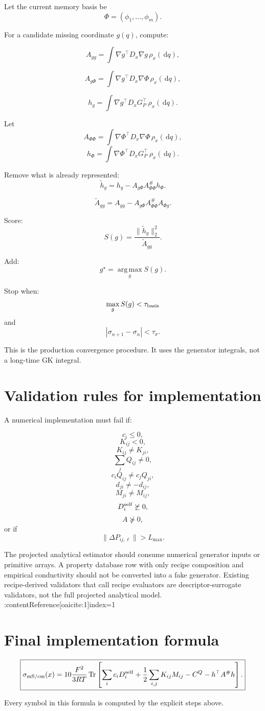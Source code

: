 \documentclass[11pt]{article}
\newcommand{\dd}{\,\mathrm d}
\newcommand{\Tr}{\operatorname{Tr}}
\newcommand{\argmax}{\operatorname*{arg\,max}}
\begin{document}
  Let the current memory basis be
  \[
  \Phi=(\phi_1,\ldots,\phi_m).
  \]

  For a candidate missing coordinate \(g(q)\), compute:

  \[
  A_{gg}
  =
  \int
  \nabla g^\top D_x\nabla g\,\rho_x(\dd q),
  \]

  \[
  A_{g\Phi}
  =
  \int
  \nabla g^\top D_x\nabla\Phi\,\rho_x(\dd q),
  \]

  \[
  h_g
  =
  \int
  \nabla g^\top D_xG_P^\top\,\rho_x(\dd q).
  \]

  Let
  \[
  A_{\Phi\Phi}
  =
  \int
  \nabla\Phi^\top D_x\nabla\Phi\,\rho_x(\dd q),
  \]
  \[
  h_\Phi
  =
  \int
  \nabla\Phi^\top D_xG_P^\top\,\rho_x(\dd q).
  \]

  Remove what is already represented:
  \[
  \tilde h_g
  =
  h_g-A_{g\Phi}A_{\Phi\Phi}^\#h_\Phi.
  \]

  \[
  \tilde A_{gg}
  =
  A_{gg}-A_{g\Phi}A_{\Phi\Phi}^\#A_{\Phi g}.
  \]

  Score:
  \[
  S(g)
  =
  \frac{\|\tilde h_g\|_2^2}{\tilde A_{gg}}.
  \]

  Add:
  \[
  g^\star=\argmax_g S(g).
  \]

  Stop when:
  \[
  \max_gS(g)<\tau_{\rm basis}
  \]
  and
  \[
  |\sigma_{n+1}-\sigma_n|<\tau_\sigma.
  \]

  This is the production convergence procedure. It uses the generator integrals,
  not a long-time GK integral.

  \section{Validation rules for implementation}

  A numerical implementation must fail if:

  \[
  c_i\le0,
  \]
  \[
  K_{ij}<0,
  \]
  \[
  K_{ij}\ne K_{ji},
  \]
  \[
  \sum_jQ_{ij}\ne0,
  \]
  \[
  c_iQ_{ij}\ne c_jQ_{ji},
  \]
  \[
  d_{ji}\ne-d_{ij},
  \]
  \[
  M_{ji}\ne M_{ij},
  \]
  \[
  D_i^{\rm self}\not\succeq0,
  \]
  \[
  A\not\succeq0,
  \]
  or if
  \[
  \|\Delta P_{ij,\ell}\|>L_{\max}.
  \]

  The projected analytical estimator should consume numerical generator inputs or
  primitive arrays. A property database row with only recipe composition and
  empirical conductivity should not be converted into a fake generator. Existing
  recipe-derived validators that call recipe evaluators are descriptor-surrogate
  validators, not the full projected analytical model. :contentReference[oaicite:1]{index=1}

  \section{Final implementation formula}

  \[
  \boxed{
  \sigma_{\rm mS/cm}(x)
  =
  10\frac{F^2}{3RT}
  \Tr
  \left[
  \sum_i c_iD_i^{\rm self}
  +
  \frac12\sum_{i,j}K_{ij}M_{ij}
  -
  C^Q
  -
  h^\top A^\#h
  \right].
  }
  \]

  Every symbol in this formula is computed by the explicit steps above.

  
\end{document}
